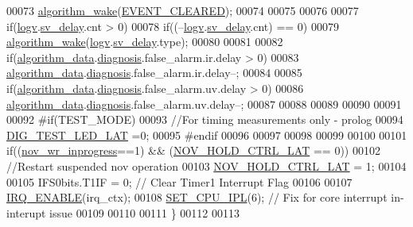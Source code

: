 \begin{DoxyCode}
00073           \hyperlink{a00016_a42ed16c7ef20e0c0031fe7ba7ae377b3}{algorithm\_wake}(\hyperlink{a00021_a602c125746b241f3a37e9fd5f43412b0}{EVENT\_CLEARED});
00074     
00075 
00076 
00077      \textcolor{keywordflow}{if}(\hyperlink{a00021_a2e89c46668b39a17753c238950c9e1ec}{logv}.\hyperlink{a00021_a854b8f967c206a5f3e4aeaf91a782b3e}{sv\_delay}.cnt > 0)
00078          \textcolor{keywordflow}{if}((--\hyperlink{a00021_a2e89c46668b39a17753c238950c9e1ec}{logv}.\hyperlink{a00021_a854b8f967c206a5f3e4aeaf91a782b3e}{sv\_delay}.cnt) == 0)
00079              \hyperlink{a00016_a42ed16c7ef20e0c0031fe7ba7ae377b3}{algorithm\_wake}(\hyperlink{a00021_a2e89c46668b39a17753c238950c9e1ec}{logv}.\hyperlink{a00021_a854b8f967c206a5f3e4aeaf91a782b3e}{sv\_delay}.type);
00080 
00081 
00082      \textcolor{keywordflow}{if}(\hyperlink{a00016_a183caa40cd01e79ee309cc9c4a225197}{algorithm\_data}.\hyperlink{a00016_a16f85d57ec98b4ad05f5a2e10536b3c6}{diagnosis}.false\_alarm.ir.delay > 0)
00083         \hyperlink{a00016_a183caa40cd01e79ee309cc9c4a225197}{algorithm\_data}.\hyperlink{a00016_a16f85d57ec98b4ad05f5a2e10536b3c6}{diagnosis}.false\_alarm.ir.delay--;
00084 
00085      \textcolor{keywordflow}{if}(\hyperlink{a00016_a183caa40cd01e79ee309cc9c4a225197}{algorithm\_data}.\hyperlink{a00016_a16f85d57ec98b4ad05f5a2e10536b3c6}{diagnosis}.false\_alarm.uv.delay > 0)
00086         \hyperlink{a00016_a183caa40cd01e79ee309cc9c4a225197}{algorithm\_data}.\hyperlink{a00016_a16f85d57ec98b4ad05f5a2e10536b3c6}{diagnosis}.false\_alarm.uv.delay--;
00087 
00088     
00089      
00090 
00091 
00092 \textcolor{preprocessor}{#if(TEST\_MODE)}
00093     \textcolor{comment}{//For timing measurements only - prolog}
00094     \hyperlink{a00058_a4c044f78fb8b7ee19bfdb5d2b204b50e}{DIG\_TEST\_LED\_LAT} =0;     
00095 \textcolor{preprocessor}{#endif}
00096 
00097 
00098 
00099      
00100   
00101     \textcolor{keywordflow}{if}((\hyperlink{a00029_a56fe014653ebdce270aeac664bf86e65}{nov\_wr\_inprogress}==1) && (\hyperlink{a00029_aa03a6ff293decd7159ed1642ccbac971}{NOV\_HOLD\_CTRL\_LAT} == 0))
00102         \textcolor{comment}{//Restart suspended nov operation}
00103     \hyperlink{a00029_aa03a6ff293decd7159ed1642ccbac971}{NOV\_HOLD\_CTRL\_LAT} = 1;
00104 
00105     IFS0bits.T1IF = 0;    \textcolor{comment}{// Clear Timer1 Interrupt Flag}
00106     
00107    \hyperlink{a00033_abc8e0f43382f8b0fdf60d35a93c20c57}{IRQ\_ENABLE}(irq\_ctx);
00108    \hyperlink{a00015_a34d4c80d85281a545f3c7f1530803d65}{SET\_CPU\_IPL}(6);       \textcolor{comment}{// Fix for core interrupt in-interupt issue}
00109 
00110 
00111 \}
00112 
00113 
\end{DoxyCode}

